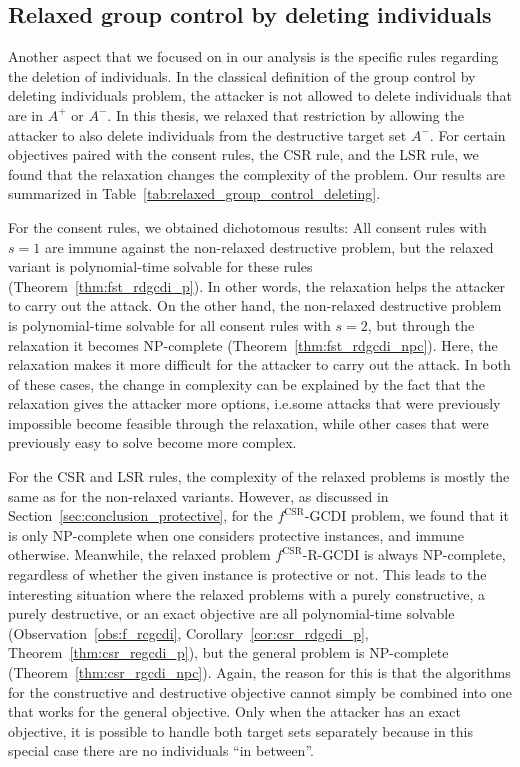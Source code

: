 \documentclass[
    12pt,               %
    a4paper,            %
    bibtotoc,           %
    pointlessnumbers,   %
    ngerman,            %
    titlepage,          %
    leqno,              %
    ]{scrarticle}       %
\newcommand\secref{Section~\ref}
\newcommand\tableref{Table~\ref}
\newcommand\thmref{Theorem~\ref}
\newcommand\corref{Corollary~\ref}
\newcommand\obsref{Observation~\ref}
\begin{document}
\subsection{Relaxed group control by deleting individuals}
\label{sec:conclusion_relaxed}

Another aspect that we focused on in our analysis is the specific rules regarding the deletion of individuals. In the classical definition of the group control by deleting individuals problem, the attacker is not allowed to delete individuals that are in $A^+$ or $A^-$. In this thesis, we relaxed that restriction by allowing the attacker to also delete individuals from the destructive target set $A^-$. For certain objectives paired with the consent rules, the CSR rule, and the LSR rule, we found that the relaxation changes the complexity of the problem. Our results are summarized in \tableref{tab:relaxed_group_control_deleting}.

For the consent rules, we obtained dichotomous results: All consent rules with $s=1$ are immune against the non-relaxed destructive problem, but the relaxed variant is polynomial-time solvable for these rules (\thmref{thm:fst_rdgcdi_p}). In other words, the relaxation helps the attacker to carry out the attack. On the other hand, the non-relaxed destructive problem is polynomial-time solvable for all consent rules with $s=2$, but through the relaxation it becomes NP-complete (\thmref{thm:fst_rdgcdi_npc}). Here, the relaxation makes it more difficult for the attacker to carry out the attack. In both of these cases, the change in complexity can be explained by the fact that the relaxation gives the attacker more options, i.e.\@ some attacks that were previously impossible become feasible through the relaxation, while other cases that were previously easy to solve become more complex.

For the CSR and LSR rules, the complexity of the relaxed problems is mostly the same as for the non-relaxed variants. However, as discussed in \secref{sec:conclusion_protective}, for the $f^{\text{CSR}}$-GCDI problem, we found that it is only NP-complete when one considers protective instances, and immune otherwise. Meanwhile, the relaxed problem $f^{\text{CSR}}$-R-GCDI is always NP-complete, regardless of whether the given instance is protective or not. This leads to the interesting situation where the relaxed problems with a purely constructive, a purely destructive, or an exact objective are all polynomial-time solvable (\obsref{obs:f_rcgcdi}, \corref{cor:csr_rdgcdi_p}, \thmref{thm:csr_regcdi_p}), but the general problem is NP-complete (\thmref{thm:csr_rgcdi_npc}). Again, the reason for this is that the algorithms for the constructive and destructive objective cannot simply be combined into one that works for the general objective. Only when the attacker has an exact objective, it is possible to handle both target sets separately because in this special case there are no individuals ``in between''.
\end{document}
